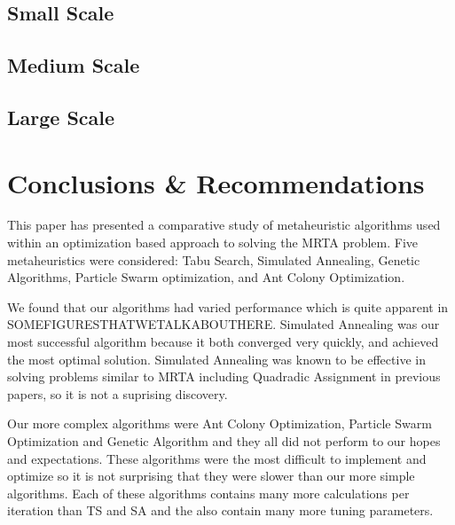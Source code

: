 \documentclass[a4paper]{article}
\begin{document}
\subsection{Small Scale}

\subsection{Medium Scale}

\subsection{Large Scale}

\section{Conclusions \& Recommendations}


This paper has presented a comparative study of metaheuristic algorithms used within an optimization based approach to solving the MRTA problem. Five metaheuristics were considered: Tabu Search, Simulated Annealing, Genetic Algorithms, Particle Swarm optimization, and Ant Colony Optimization.

We found that our algorithms had varied performance which is quite apparent in SOMEFIGURESTHATWETALKABOUTHERE. Simulated Annealing was our most successful algorithm because it both converged very quickly, and achieved the most optimal solution. Simulated Annealing was known to be effective in solving problems similar to MRTA including Quadradic Assignment in previous papers, so it is not a suprising discovery\cite{Badreldin}.

Our more complex algorithms were Ant Colony Optimization, Particle Swarm Optimization and Genetic Algorithm and they all did not perform to our hopes and expectations. These algorithms were the most difficult to implement and optimize so it is not surprising that they were slower than our more simple algorithms. Each of these algorithms contains many more calculations per iteration than TS and SA and the also contain many more tuning parameters.
\end{document}
